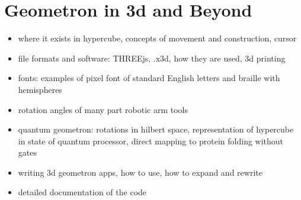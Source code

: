 
\section{Geometron in 3d and Beyond}

\begin{itemize}
\tightlist
\item
  where it exists in hypercube, concepts of movement and construction, cursor
\item
  file formats and software: THREEjs, .x3d, how they are used, 3d printing
\item
  fonts: examples of pixel font of standard English letters and braille with hemispheres
\item
  rotation angles of many part robotic arm tools
\item
  quantum geometron: rotations in hilbert space, representation of hypercube in state of quantum processor, direct mapping to protein folding without gates 
\item
  writing 3d geometron apps, how to use, how to expand and rewrite
\item 
  detailed documentation of the code
\end{itemize}